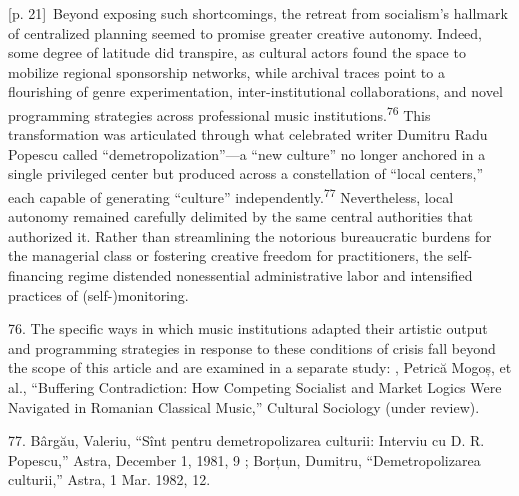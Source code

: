 \documentclass[10pt,a4paper]{article}
\begin{document}
{\scriptsize\color{gray} [p. 21]}\ Beyond exposing such shortcomings, the retreat from socialism’s hallmark of centralized planning seemed to promise greater creative autonomy. Indeed, some degree of latitude did transpire, as cultural actors found the space to mobilize regional sponsorship networks, while archival traces point to a flourishing of genre experimentation, inter-institutional collaborations, and novel programming strategies across professional music institutions.\nobreak\textsuperscript{76} This transformation was articulated through what celebrated writer Dumitru Radu Popescu called “demetropolization”—a “new culture” no longer anchored in a single privileged center but produced across a constellation of “local centers,” each capable of generating “culture” independently.\nobreak\textsuperscript{77} Nevertheless, local autonomy remained carefully delimited by the same central authorities that authorized it. Rather than streamlining the notorious bureaucratic burdens for the managerial class or fostering creative freedom for practitioners, the self-financing regime distended nonessential administrative labor and intensified practices of (self-)monitoring.\par{\small 76. The specific ways in which music institutions adapted their artistic output and programming strategies in response to these conditions of crisis fall beyond the scope of this article and are examined in a separate study: , Petrică Mogoș, et al., “Buffering Contradiction: How Competing Socialist and Market Logics Were Navigated in Romanian Classical Music,” Cultural Sociology (under review).\par}{\small 77. Bârgău, Valeriu, “Sînt pentru demetropolizarea culturii: Interviu cu D. R. Popescu,” Astra, December 1, 1981, 9 ; Borțun, Dumitru, “Demetropolizarea culturii,” Astra, 1 Mar. 1982, 12.\par}
\end{document}

